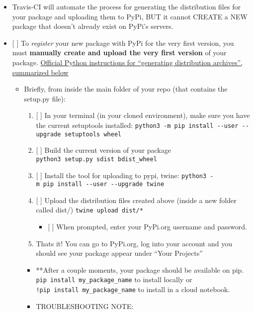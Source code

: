 \documentclass[11pt]{article}
\providecommand{\tightlist}{%
      \setlength{\itemsep}{0pt}\setlength{\parskip}{0pt}}
\begin{document}
\begin{itemize}
\tightlist
\item
  Travis-CI will automate the process for generating the distribution
  files for your package and uploading them to PyPi, BUT it cannot
  CREATE a NEW package that doesn't already exist on PyPi's servers.
\item
  {[} {]} To \emph{register} your new package with PyPi for the very
  first version, you must \textbf{manually create and upload the very
  first version} of your package.
  \href{https://packaging.python.org/tutorials/packaging-projects/\#generating-distribution-archives}{Official
  Python instructions for ``generating distribution archives'',
  summarized below}

  \begin{itemize}
  \tightlist
  \item
    Briefly, from inside the main folder of your repo (that contains the
    setup.py file):

    \begin{enumerate}
    \def\labelenumi{\arabic{enumi}.}
    \tightlist
    \item
      {[} {]} In your terminal (in your cloned environment), make sure
      you have the current setuptools installed:
      \texttt{python3\ -m\ pip\ install\ -\/-user\ -\/-upgrade\ setuptools\ wheel}
    \item
      {[} {]} Build the current version of your package
      \texttt{python3\ setup.py\ sdist\ bdist\_wheel}
    \item
      {[} {]} Install the tool for uploading to pypi, twine:
      \texttt{python3\ -m\ pip\ install\ -\/-user\ -\/-upgrade\ twine}
    \item
      {[} {]} Upload the distribution files created above (inside a new
      folder called dist/) \texttt{twine\ upload\ dist/*}

      \begin{itemize}
      \tightlist
      \item
        {[} {]} When prompted, enter your PyPi.org username and
        password.
      \end{itemize}
    \item
      Thats it! You can go to PyPi.org, log into your account and you
      should see your package appear under ``Your Projects''\\
    \end{enumerate}

    \begin{itemize}
    \item
      **After a couple moments, your package should be available on pip.
      \texttt{pip\ install\ my\_package\_name} to install locally or
      \texttt{!pip\ install\ my\_package\_name} to install in a cloud
      notebook.
    \item
      TROUBLESHOOTING NOTE:


\end{itemize}
\end{itemize}
\end{itemize}
\end{document}
